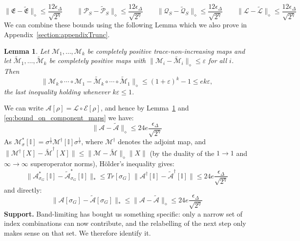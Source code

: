 \documentclass[aps,floatfix,10pt,amssymb,amsfont,amsmath,superscriptaddress,float,nofootinbib,longbibliography,nobalancelastpage,twocolumn]{revtex4-2}
\newtheorem{lemma}{Lemma}
\begin{document}
\begin{widetext}
\begin{equation}
    \|\mathfrak{E} - \tilde{\mathfrak{E}}\|_{\diamond} \leq \frac{12\epsilon_{\Delta}}{\sqrt{2^{\eta}}} \qquad\|\mathcal{P}_S - \tilde{\mathcal{P}}_S\|_{\diamond} \leq \frac{12\epsilon_{\Delta}}{\sqrt{2^{\eta}}} \qquad\|\mathcal{Q}_S - \tilde{\mathcal{Q}}_S\|_{\diamond} \leq \frac{12\epsilon_{\Delta}}{\sqrt{2^{\eta}}}  \qquad\|\mathcal{L} - \tilde{\mathcal{L}}\|_{\diamond} \leq \frac{12\epsilon_{\Delta}}{\sqrt{2^{\eta}}} 
    \label{eq:bound_on_component_maps}
\end{equation}
We can combine these bounds using the following Lemma which we also prove in Appendix~\ref{section:appendixTrunc}.
\begin{lemma}
\label{lemma:composition}
Let $\mathcal{M}_1, \ldots, \mathcal{M}_k$ be completely positive trace-non-increasing maps and let $\tilde{\mathcal{M}}_1, \ldots, \tilde{\mathcal{M}}_k$ be completely positive maps with $\|\mathcal{M}_i - \tilde{\mathcal{M}}_i\|_{\diamond} \leq \varepsilon$ for all $i$. Then
\begin{equation}
    \|\mathcal{M}_k \circ \cdots \circ \mathcal{M}_1 - \tilde{\mathcal{M}}_k \circ \cdots \circ \tilde{\mathcal{M}}_1\|_{\diamond} \leq (1+\varepsilon)^k - 1 \leq e k \varepsilon,
\end{equation}
the last inequality holding whenever $k\varepsilon \leq 1$.
\end{lemma}
We can write $\mathcal{A}[\rho] = \mathcal{L} \circ \mathcal{E}[\rho]$, and hence by Lemma~\ref{lemma:composition} and \eqref{eq:bound_on_component_maps} we have:
\begin{equation}
    \|\mathcal{A} - \tilde{\mathcal{A}}\|_{\diamond} \leq 24e \frac{\epsilon_{\Delta}}{\sqrt{2^{\eta}}}
\end{equation}
As $\mathcal{M}^*_{\sigma}[\mathbb{I}] = \sigma^{\frac{1}{2}}\mathcal{M}^{\dagger}[\mathbb{I}]\sigma^{\frac{1}{2}}$, where $\mathcal{M}^{\dagger}$ denotes the adjoint map, and $\|\mathcal{M}^{\dagger}[X] - \tilde{\mathcal{M}}^{\dagger}[X]\| \leq \|\mathcal{M}-\tilde{\mathcal{M}}\|_{\diamond}\|X\|$ (by the duality of the $1\to1$ and $\infty\to\infty$ superoperator norms), H\"older's inequality gives:
\begin{equation}
    \|\mathcal{A}^*_{\sigma_G}[\mathbb{I}] - \tilde{\mathcal{A}}^*_{\sigma_G}[\mathbb{I}]\|_* \leq Tr[\sigma_G]\,\|\mathcal{A}^{\dagger}[\mathbb{I}] - \tilde{\mathcal{A}}^{\dagger}[\mathbb{I}]\| \leq 24e\frac{\epsilon_{\Delta}}{\sqrt{2^{\eta}}}
    \label{eq:AAtildeclose1}
\end{equation}
and directly:
\begin{equation}
    \|\mathcal{A}[\sigma_G] - \tilde{\mathcal{A}}[\sigma_G]\|_* \leq \|\mathcal{A}-\tilde{\mathcal{A}}\|_{\diamond} \leq 24e\frac{\epsilon_{\Delta}}{\sqrt{2^{\eta}}}
    \label{eq:AAtildeclose2}
\end{equation}
\textbf{Support.} Band-limiting has bought us something specific: only a narrow set of index combinations can now contribute, and the relabelling of the next step only makes sense on that set. We therefore identify it.


\end{widetext}
\end{document}
